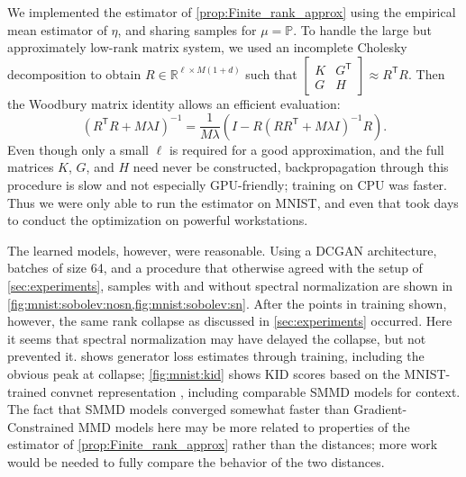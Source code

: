 \documentclass{article}
\newcommand{\R}{\mathbb R}
\newcommand{\PP}{\mathbb P}
\newcommand{\tp}{^\mathsf{T}}
\let\citep\parencite
\begin{document}
We implemented the estimator of \cref{prop:Finite_rank_approx}
using the empirical mean estimator of $\eta$,
and sharing samples for $\mu = \PP$.
To handle the large but approximately low-rank matrix system,
we used an incomplete Cholesky decomposition \parencite[Algorithm 5.12]{shawe-taylor-christianini}
to obtain $R \in \R^{\ell \times M (1 + d)}$
such that $\begin{bmatrix} K & G\tp \\ G & H \end{bmatrix} \approx R\tp R$.
Then the Woodbury matrix identity allows an efficient evaluation:
\[
  \left( R\tp R + M \lambda I \right)^{-1}
  = \frac{1}{M \lambda} \left( I - R (R R\tp + M \lambda I)^{-1} R \right)
.\]
Even though only a small $\ell$ is required for a good approximation,
and the full matrices $K$, $G$, and $H$ need never be constructed,
backpropagation through this procedure is slow
and not especially GPU-friendly; training on CPU was faster.
Thus we were only able to run the estimator on MNIST,
and even that took days to conduct the optimization on powerful workstations.

The learned models, however, were reasonable.
Using a DCGAN architecture,
batches of size 64,
and a procedure that otherwise agreed with the setup of \cref{sec:experiments},
samples with and without spectral normalization
are shown in \cref{fig:mnist:sobolev:nosn,fig:mnist:sobolev:sn}.
After the points in training shown, however,
the same rank collapse as discussed in \cref{sec:experiments} occurred.
Here it seems that spectral normalization may have delayed the collapse,
but not prevented it.
 shows generator loss estimates through training,
including the obvious peak at collapse;
\cref{fig:mnist:kid} shows KID scores based on the MNIST-trained convnet representation \citep{Binkowski:2018},
including comparable SMMD models for context.
The fact that SMMD models converged somewhat faster than Gradient-Constrained MMD models here
may be more related to properties of
the estimator of \cref{prop:Finite_rank_approx}
rather than the distances;
more work would be needed to fully compare the behavior of the two distances.
\end{document}
